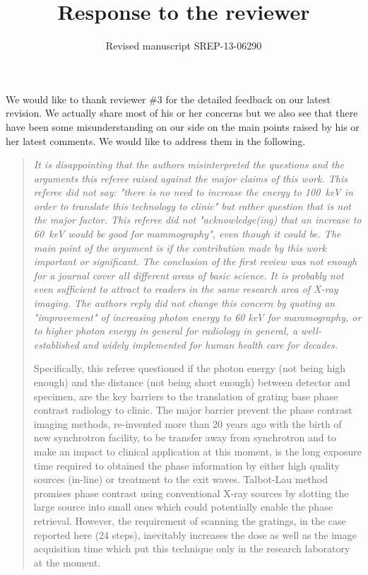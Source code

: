 \documentclass[a4paper,english]{scrartcl}
\title{Response to the reviewer}
\author{Revised manuscript SREP-13-06290}
\date{}
\newenvironment{reviewerquote}{\begin{quote}\itshape}{\end{quote}}
\begin{document}
\maketitle

\noindent

We would like to thank reviewer \#3 for the detailed feedback on our
latest revision. We actually share most of his or her concerns but we also see
that there have been some misunderstanding on our side on the main points
raised by his or her latest comments. We would like to address them in the
following. 

\begin{reviewerquote}
It is disappointing that the authors misinterpreted the
questions and the arguments this referee raised against the major claims of
this work. This referee did not say: "there is no need to increase the
energy to \SI{100}{\kilo\eV} in order to translate this technology to clinic" but
rather question that is not the major factor. This referee did not
"acknowledge(ing) that an increase to \SI{60}{\kilo\eV} would be good for mammography",
even though it could be. The main point of the argument is if the
contribution made by this work important or significant. The conclusion of
the first review was not enough for a journal cover all different areas of
basic science. It is probably not even sufficient to attract to readers in
the same research area of X-ray imaging. The authors reply did not change
this concern by quoting an "improvement" of increasing photon energy to 60
keV for mammography, or to higher photon energy in general for radiology in
general, a well-established and widely implemented for human health care for
decades.

Specifically, this referee questioned if the photon energy (not
being high enough) and the distance (not being short enough) between
detector and specimen, are the key barriers to the translation of grating
base phase contrast radiology to clinic. The major barrier prevent the phase
contrast imaging methods, re-invented more than 20 years ago with the birth
of new synchrotron facility, to be transfer away from synchrotron and to
make an impact to clinical application at this moment, is the long exposure
time required to obtained the phase information by either high quality
sources (in-line) or treatment to the exit waves. Talbot-Lau method promises
phase contrast using conventional X-ray sources by slotting the large source
into small ones which could potentially enable the phase retrieval. However,
the requirement of scanning the gratings, in the case reported here (24
steps), inevitably increases the dose as well as the image acquisition time
which put this technique only in the research laboratory at the moment.
\end{reviewerquote}
\end{document}
